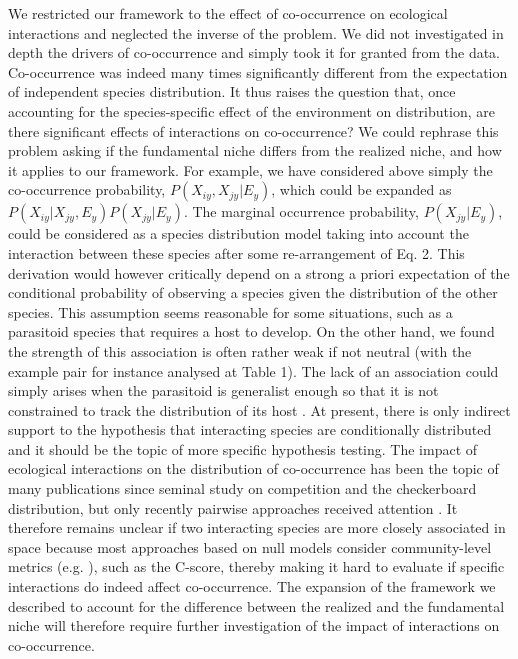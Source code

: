 \documentclass[12pt]{article}
\begin{document}
We restricted our framework to the effect of co-occurrence on ecological
interactions and neglected the inverse of the problem. We did not investigated
in depth the drivers of co-occurrence and simply took it for granted from the
data. Co-occurrence was indeed many times significantly different from the
expectation of independent species distribution. It thus raises the question
that, once accounting for the species-specific effect of the environment on
distribution, are there significant effects of interactions on co-occurrence?
We could rephrase this problem asking if the fundamental niche differs from
the realized niche, and how it applies to our framework. For example, we have
considered above simply the co-occurrence probability, $P(X_{iy},X_{jy}|E_y)$,
which could be expanded as  $P(X_{iy}|X_{jy},E_y) P(X_{jy}| E_y )$. The
marginal occurrence probability, $P(X_{jy}|E_y )$, could be considered as a
species distribution model taking into account the interaction between these
species after some re-arrangement of Eq. 2. This derivation would however
critically depend on a strong a priori expectation of the conditional
probability of observing a species given the distribution of the other
species. This assumption seems reasonable for some situations, such as a
parasitoid species that requires a host to develop. On the other hand, we
found the strength of this association is often rather weak if not neutral
(with the example pair for instance analysed at Table 1). The lack of an
association could simply arises when the parasitoid is generalist enough so
that it is not constrained to track the distribution of its host
\citep{Cazelles2015}. At present, there is only indirect support to the
hypothesis that interacting species are conditionally distributed and it
should be the topic of more specific hypothesis testing. The impact of
ecological interactions on the distribution of co-occurrence has been the
topic of many publications since \citealt{Diamond1975} seminal study on
competition and the checkerboard distribution, but only recently pairwise
approaches received attention \citep{Veech2013}. It therefore remains unclear
if two interacting species are more closely associated in space because most
approaches based on null models consider community-level metrics (e.g.
\citealt{Gotelli2000}), such as the C-score, thereby making it hard to
evaluate if specific interactions do indeed affect co-occurrence. The
expansion of the framework we described to account for the difference between
the realized and the fundamental niche will therefore require further
investigation of the impact of interactions on co-occurrence.
\end{document}
